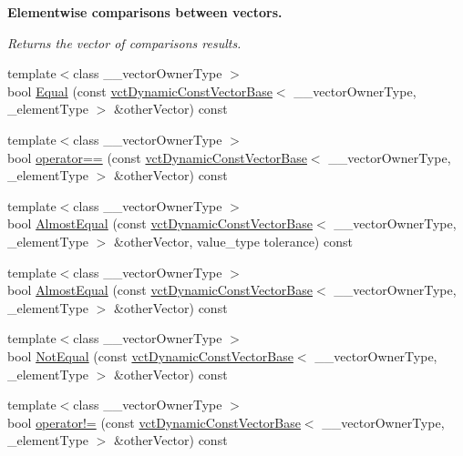 \begin{Indent}{\bf Elementwise comparisons between vectors.}\par
{\em Returns the vector of comparison\textquotesingle{}s results. }\begin{DoxyCompactItemize}
\item 
{\footnotesize template$<$class \+\_\+\+\_\+vector\+Owner\+Type $>$ }\\bool \hyperlink{classvct_dynamic_const_vector_base_acc28a646977b6f3f5e5c74c31fb59658}{Equal} (const \hyperlink{classvct_dynamic_const_vector_base}{vct\+Dynamic\+Const\+Vector\+Base}$<$ \+\_\+\+\_\+vector\+Owner\+Type, \+\_\+element\+Type $>$ \&other\+Vector) const 
\item 
{\footnotesize template$<$class \+\_\+\+\_\+vector\+Owner\+Type $>$ }\\bool \hyperlink{classvct_dynamic_const_vector_base_a7213f01662571a4c678f8dd7fff41283}{operator==} (const \hyperlink{classvct_dynamic_const_vector_base}{vct\+Dynamic\+Const\+Vector\+Base}$<$ \+\_\+\+\_\+vector\+Owner\+Type, \+\_\+element\+Type $>$ \&other\+Vector) const 
\item 
{\footnotesize template$<$class \+\_\+\+\_\+vector\+Owner\+Type $>$ }\\bool \hyperlink{classvct_dynamic_const_vector_base_aa066902b9db1f5adf7ed041255d1966c}{Almost\+Equal} (const \hyperlink{classvct_dynamic_const_vector_base}{vct\+Dynamic\+Const\+Vector\+Base}$<$ \+\_\+\+\_\+vector\+Owner\+Type, \+\_\+element\+Type $>$ \&other\+Vector, value\+\_\+type tolerance) const 
\item 
{\footnotesize template$<$class \+\_\+\+\_\+vector\+Owner\+Type $>$ }\\bool \hyperlink{classvct_dynamic_const_vector_base_a31e8da9af751fb8677d4113f1c66b0d8}{Almost\+Equal} (const \hyperlink{classvct_dynamic_const_vector_base}{vct\+Dynamic\+Const\+Vector\+Base}$<$ \+\_\+\+\_\+vector\+Owner\+Type, \+\_\+element\+Type $>$ \&other\+Vector) const 
\item 
{\footnotesize template$<$class \+\_\+\+\_\+vector\+Owner\+Type $>$ }\\bool \hyperlink{classvct_dynamic_const_vector_base_a813a9d4d294740d8b238533cd5b69e77}{Not\+Equal} (const \hyperlink{classvct_dynamic_const_vector_base}{vct\+Dynamic\+Const\+Vector\+Base}$<$ \+\_\+\+\_\+vector\+Owner\+Type, \+\_\+element\+Type $>$ \&other\+Vector) const 
\item 
{\footnotesize template$<$class \+\_\+\+\_\+vector\+Owner\+Type $>$ }\\bool \hyperlink{classvct_dynamic_const_vector_base_a9c1a544a366dd2b4b33480f77b9f1648}{operator!=} (const \hyperlink{classvct_dynamic_const_vector_base}{vct\+Dynamic\+Const\+Vector\+Base}$<$ \+\_\+\+\_\+vector\+Owner\+Type, \+\_\+element\+Type $>$ \&other\+Vector) const 

\end{DoxyCompactItemize}
\end{Indent}
